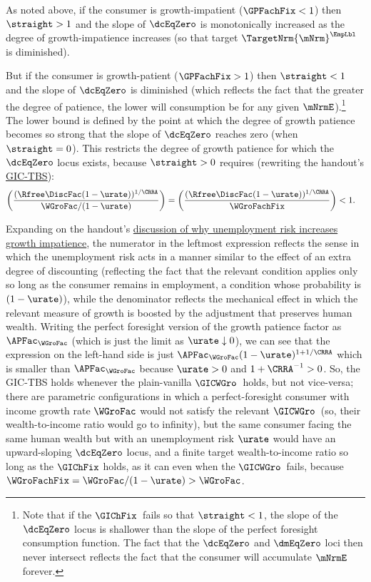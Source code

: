 \documentclass{econark}
\begin{document}
As noted above, if the consumer is growth-impatient ($\GPFachFix < 1$) then $\straight > 1$ and the slope of $\dcEqZero$ is monotonically increased as the degree of growth-impatience increases (so that target $\TargetNrm{\mNrm}^{\EmpLbl}$ is diminished).  

But if the consumer is growth-patient ($\GPFachFix > 1$) then $\straight < 1$ and the slope of $\dcEqZero$ is diminished (which reflects the fact that the greater the degree of patience, the lower will consumption be for any given $\mNrmE$).\footnote{Note that if the $\GIChFix$~fails so that $\straight < 1$, the slope of the $\dcEqZero$ locus is shallower than the slope of the perfect foresight consumption function.  The fact that the $\dcEqZero$ and $\dmEqZero$ loci then never intersect reflects the fact that the consumer will accumulate $\mNrmE$ forever.}  The lower bound is defined by the point at which the degree of growth patience becomes so strong that the slope of $\dcEqZero$ reaches zero (when $\straight=0$).  This restricts the degree of growth patience for which the $\dcEqZero$ locus exists, because $\straight > 0$ requires (rewriting the handout's \hyperref[eq:GICExistsSoln]{GIC-TBS}):
\begin{equation}\begin{gathered}\begin{aligned}
  \left(\frac{(\Rfree \DiscFac (1-\urate))^{1/\CRRA}}{\WGroFac/(1-\urate)}\right) = \left(\frac{(\Rfree \DiscFac (1-\urate))^{1/\CRRA}}{\WGroFachFix}\right) & <  1
.\end{aligned}\end{gathered}\end{equation}

Expanding on the handout's \hyperref[sec:URiskGrowthImpatience]{discussion of why unemployment risk increases growth impatience}, the numerator in the leftmost expression reflects the sense in which the unemployment risk acts in a manner similar to the effect of an extra degree of discounting (reflecting the fact that the relevant condition applies only so long as the consumer remains in employment, a condition whose probability is $(1-\urate)$), while the denominator reflects the mechanical effect in which the relevant measure of growth is boosted by the adjustment that preserves human wealth.  Writing the perfect foresight version of the growth patience factor as $\APFac_{\WGroFac}$ (which is just the limit as $\urate \downarrow 0$), we can see that the expression on the left-hand side is just $\APFac_{\WGroFac}(1-\urate)^{1+1/\CRRA}$ which is smaller than $\APFac_{\WGroFac}$ because $\urate>0$ and $1+\CRRA^{-1} > 0$.  So, the GIC-TBS holds whenever the plain-vanilla $\GICWGro$~holds, but not vice-versa; there are parametric configurations in which a perfect-foresight consumer with income growth rate $\WGroFac$ would not satisfy the relevant $\GICWGro$~(so, their wealth-to-income ratio would go to infinity), but the same consumer facing the same human wealth but with an unemployment risk $\urate$ would have an upward-sloping $\dcEqZero$ locus, and a finite target wealth-to-income ratio so long as the $\GIChFix$ holds, as it can even when the $\GICWGro$~fails, because $\WGroFachFix = \WGroFac/(1-\urate) > \WGroFac$.  
\end{document}
